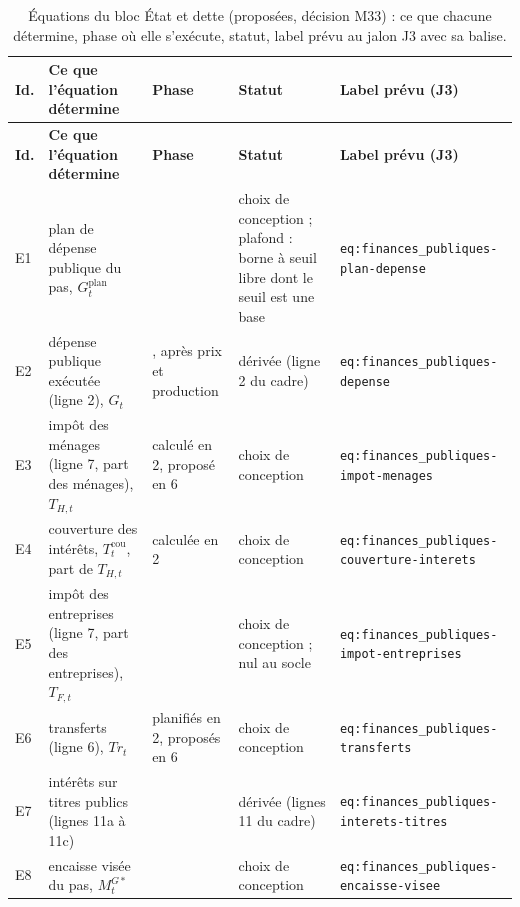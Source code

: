 \documentclass[11pt,a4paper]{article}
\begin{document}
\begin{center}\footnotesize
\setlength{\tabcolsep}{4pt}
\begin{longtable}{>{\raggedright\arraybackslash}p{0.8cm}>{\raggedright\arraybackslash}p{4.6cm}>{\raggedright\arraybackslash}p{1.9cm}>{\raggedright\arraybackslash}p{3.0cm}>{\raggedright\arraybackslash}p{4.4cm}}
\caption{Équations du bloc État et dette (proposées, décision M33) : ce que chacune détermine, phase où elle s'exécute, statut, label prévu au jalon J3 avec sa balise.}\label{tab:finances_publiques-equations}\\
\toprule
\textbf{Id.} & \textbf{Ce que l'équation détermine} & \textbf{Phase} & \textbf{Statut} & \textbf{Label prévu (J3)}\\
\midrule
\endfirsthead
\toprule
\textbf{Id.} & \textbf{Ce que l'équation détermine} & \textbf{Phase} & \textbf{Statut} & \textbf{Label prévu (J3)}\\
\midrule
\endhead
E1 & plan de dépense publique du pas, $G^{\mathrm{plan}}_t$ & 2 & choix de conception ; plafond : borne à seuil libre dont le seuil est une base & \texttt{eq:finances\_publiques-\allowbreak plan-depense}\\
E2 & dépense publique exécutée (ligne 2), $G_t$ & 5, après prix et production & dérivée (ligne 2 du cadre) & \texttt{eq:finances\_publiques-\allowbreak depense}\\
E3 & impôt des ménages (ligne 7, part des ménages), $T_{H,t}$ & calculé en 2, proposé en 6 & choix de conception & \texttt{eq:finances\_publiques-\allowbreak impot-menages}\\
E4 & couverture des intérêts, $T^{\mathrm{cou}}_t$, part de $T_{H,t}$ & calculée en 2 & choix de conception & \texttt{eq:finances\_publiques-\allowbreak couverture-interets}\\
E5 & impôt des entreprises (ligne 7, part des entreprises), $T_{F,t}$ & 6 & choix de conception ; nul au socle & \texttt{eq:finances\_publiques-\allowbreak impot-entreprises}\\
E6 & transferts (ligne 6), $\mathit{Tr}_t$ & planifiés en 2, proposés en 6 & choix de conception & \texttt{eq:finances\_publiques-\allowbreak transferts}\\
E7 & intérêts sur titres publics (lignes 11a à 11c) & 6 & dérivée (lignes 11 du cadre) & \texttt{eq:finances\_publiques-\allowbreak interets-titres}\\
E8 & encaisse visée du pas, $M^{G*}_t$ & 7 & choix de conception & \texttt{eq:finances\_publiques-\allowbreak encaisse-visee}\\

\end{longtable}
\end{center}
\end{document}
